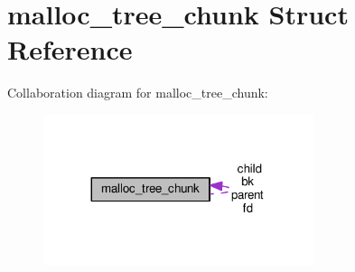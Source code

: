 \hypertarget{structmalloc__tree__chunk}{}\section{malloc\+\_\+tree\+\_\+chunk Struct Reference}
\label{structmalloc__tree__chunk}


Collaboration diagram for malloc\+\_\+tree\+\_\+chunk\+:\nopagebreak
\begin{figure}[H]
\begin{center}
\leavevmode
\includegraphics[width=224pt]{structmalloc__tree__chunk__coll__graph}
\end{center}
\end{figure}
